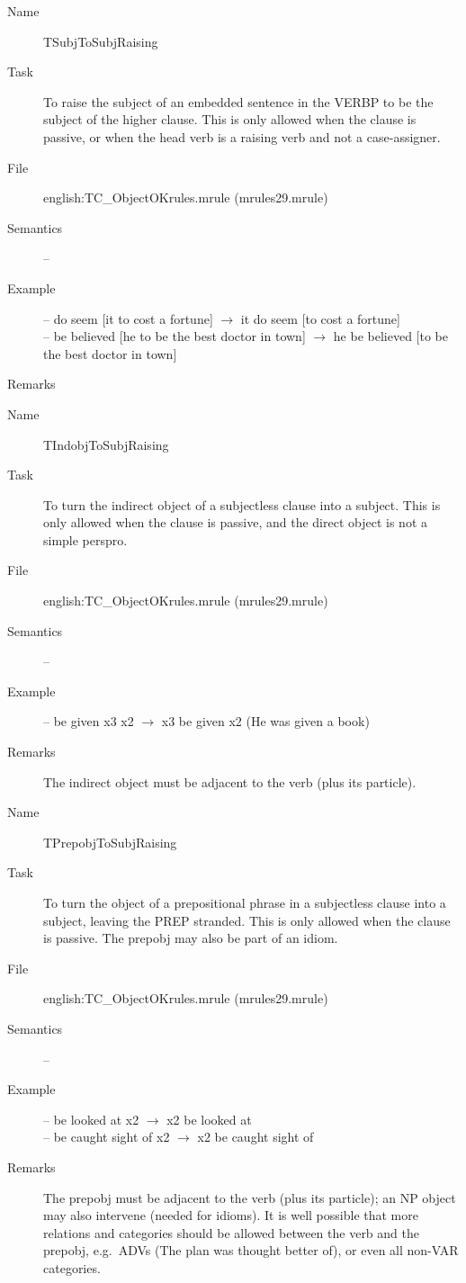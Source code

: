 \begin{description}
\vspace{1 cm}
\begin{description}
\item[Name]   TSubjToSubjRaising
\item[Task] To raise the subject of an embedded sentence in the VERBP to be the 
subject of the higher clause. This is 
only allowed when the clause is passive, or when the head verb is a raising 
verb and not a case-assigner.
\item[File] english:TC\_ObjectOKrules.mrule (mrules29.mrule)
\item[Semantics] --
\item[Example] \mbox{}
-- do seem [it to cost a fortune] $\rightarrow$ it do seem [to cost a fortune]\\
-- be believed [he to be the best doctor in town] $\rightarrow$ he be believed 
[to be the best doctor in town]
\item[Remarks] 
\end{description}

\vspace{1 cm}
\begin{description}
\item[Name] TIndobjToSubjRaising
\item[Task] To turn the indirect object of a subjectless clause into a subject. 
This is only allowed when the clause is passive, and the direct object is not a 
simple perspro.
\item[File] english:TC\_ObjectOKrules.mrule (mrules29.mrule)
\item[Semantics] --
\item[Example] -- be given x3 x2 $\rightarrow$ x3 be given x2 (He was given a 
book)
\item[Remarks] The indirect object must be adjacent to the verb (plus its 
particle).
\end{description}

\vspace{1 cm}
\begin{description}
\item[Name]   TPrepobjToSubjRaising
\item[Task] To turn the object of a prepositional phrase in a subjectless 
clause into a subject, leaving the PREP stranded.
This is only allowed when the clause is passive. The prepobj may also be part 
of an idiom.
\item[File] english:TC\_ObjectOKrules.mrule (mrules29.mrule)
\item[Semantics] --
\item[Example] \mbox{}
-- be looked at x2 $\rightarrow$ x2 be looked at \\
-- be caught sight of x2 $\rightarrow$ x2 be caught sight of
\item[Remarks] The prepobj must be adjacent to the verb (plus its 
particle); an NP object may also intervene (needed for idioms). It is well 
possible that more relations and categories should be allowed between the verb 
and 
the prepobj, e.g.\ ADVs (The plan was thought better of), or even all non-VAR 
categories.
\end{description}


\end{description}
